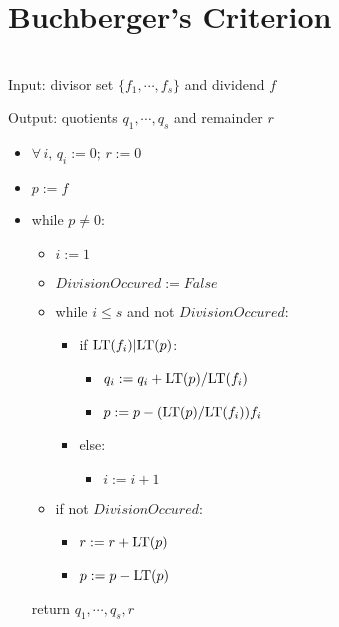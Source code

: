 \chapter{Buchberger's Criterion}

\begin{definition}
    \label{def:MvDivisionAlgorithm}
    ~\\

    Input: divisor set \(\{f_1, \cdots, f_s\}\) and dividend \(f\)

    Output: quotients \(q_1, \cdots, q_s\) and remainder \(r\)

    \begin{itemize}
        \item \(\forall\,i,\,q_i := 0;\, r := 0\)
        \item \(p := f\)
        \item while \(p \ne 0\):
            \begin{itemize}
                \item \(i := 1\)
                \item \(DivisionOccured := False\)
                \item while \(i \le s\) and not \(DivisionOccured\):
                    \begin{itemize}
                        \item if \(\mathrm{LT}(f_i) | \mathrm{LT}(p)\):
                            \begin{itemize}
                                \item \(q_i := q_i + \mathrm{LT}(p) / \mathrm{LT}(f_i)\)
                                \item \(p := p - (\mathrm{LT}(p) / \mathrm{LT}(f_i))f_i\)
                            \end{itemize}
                        \item else:
                            \begin{itemize}
                                \item \(i := i + 1\)
                            \end{itemize}
                    \end{itemize}
                \item if not \(DivisionOccured\):
                    \begin{itemize}
                        \item \(r := r + \mathrm{LT}(p)\)
                        \item \(p := p - \mathrm{LT}(p)\)
                    \end{itemize}
            \end{itemize}
        return \(q_1, \cdots, q_s, r\)
    \end{itemize}

\end{definition}


